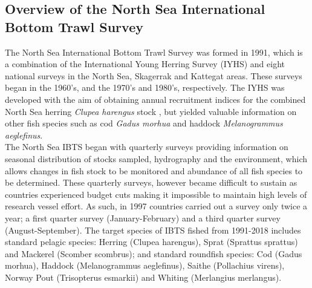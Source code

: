 \documentclass[a4paper 12pt]{article}
\numberwithin{equation}{section}
\begin{document}
\subsection{Overview of the North Sea International Bottom Trawl Survey}
\label{overview}
\indent The North Sea International Bottom Trawl Survey was formed in 1991, which is a combination of the International Young Herring Survey (IYHS) and eight national surveys in the North Sea, Skagerrak and Kattegat areas. These surveys began in the 1960's, and the 1970's and 1980's, respectively. The IYHS was developed with the aim of obtaining annual recruitment indices for the combined North Sea herring \emph{Clupea harengus} stock \citep{ICES2012}, but yielded valuable information on other fish species such as cod \emph{Gadus morhua} and haddock \emph{Melanogrammus aeglefinus}.\\
\indent The North Sea IBTS began with quarterly surveys providing information on seasonal distribution of stocks sampled, hydrography and the environment, which allows changes in fish stock to be monitored and abundance of all fish species to be determined. These quarterly surveys, however became difficult to sustain as countries experienced budget cuts making it impossible to maintain high levels of research vessel effort. As such, in 1997 countries carried out a survey only twice a year; a first quarter survey (January-February) and a third quarter survey (August-September). The target species of IBTS fished from 1991-2018 includes standard pelagic species: Herring (Clupea harengus), Sprat (Sprattus sprattus) and Mackerel (Scomber scombrus); and standard roundfish species: Cod (Gadus morhua), Haddock (Melanogrammus aeglefinus), Saithe (Pollachius virens),  Norway Pout (Trisopterus esmarkii)  and Whiting (Merlangius merlangus).
\end{document}

